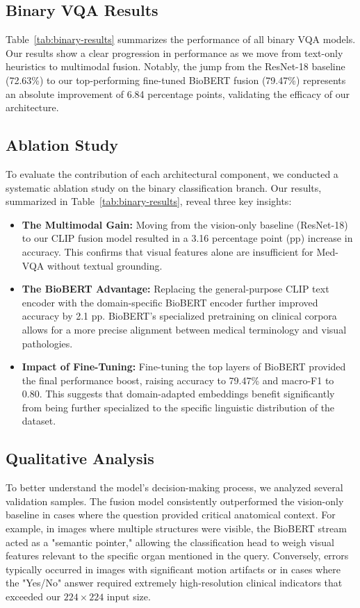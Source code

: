 \documentclass{article}
\begin{document}
\subsection{Binary VQA Results}
Table~\ref{tab:binary-results} summarizes the performance of all binary VQA models. Our results show a clear progression in performance as we move from text-only heuristics to multimodal fusion. Notably, the jump from the ResNet-18 baseline (72.63\%) to our top-performing fine-tuned BioBERT fusion (79.47\%) represents an absolute improvement of 6.84 percentage points, validating the efficacy of our architecture.

\subsection{Ablation Study}
To evaluate the contribution of each architectural component, we conducted a systematic ablation study on the binary classification branch. Our results, summarized in Table~\ref{tab:binary-results}, reveal three key insights:
\begin{itemize}
    \item \textbf{The Multimodal Gain:} Moving from the vision-only baseline (ResNet-18) to our CLIP fusion model resulted in a 3.16 percentage point (pp) increase in accuracy. This confirms that visual features alone are insufficient for Med-VQA without textual grounding.
    \item \textbf{The BioBERT Advantage:} Replacing the general-purpose CLIP text encoder with the domain-specific BioBERT encoder further improved accuracy by 2.1 pp. BioBERT's specialized pretraining on clinical corpora allows for a more precise alignment between medical terminology and visual pathologies.
    \item \textbf{Impact of Fine-Tuning:} Fine-tuning the top layers of BioBERT provided the final performance boost, raising accuracy to 79.47\% and macro-F1 to 0.80. This suggests that domain-adapted embeddings benefit significantly from being further specialized to the specific linguistic distribution of the dataset.
\end{itemize}
\subsection{Qualitative Analysis}
To better understand the model's decision-making process, we analyzed several validation samples. The fusion model consistently outperformed the vision-only baseline in cases where the question provided critical anatomical context. For example, in images where multiple structures were visible, the BioBERT stream acted as a "semantic pointer," allowing the classification head to weigh visual features relevant to the specific organ mentioned in the query. Conversely, errors typically occurred in images with significant motion artifacts or in cases where the "Yes/No" answer required extremely high-resolution clinical indicators that exceeded our $224 \times 224$ input size.
\end{document}
